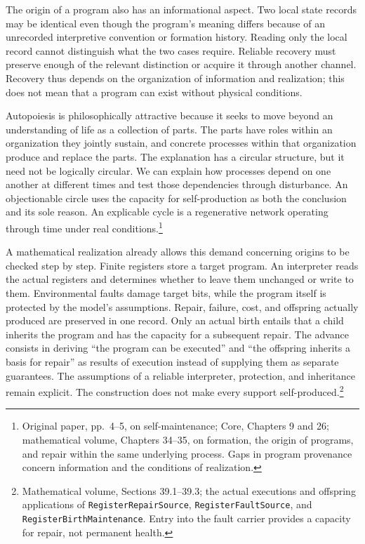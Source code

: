 \documentclass[
  english,
  11pt,
  oneside]{book}
\begin{document}
The origin of a program also has an informational aspect. Two local state records may be identical even though the program's meaning differs because of an unrecorded interpretive convention or formation history. Reading only the local record cannot distinguish what the two cases require. Reliable recovery must preserve enough of the relevant distinction or acquire it through another channel. Recovery thus depends on the organization of information and realization; this does not mean that a program can exist without physical conditions.

Autopoiesis is philosophically attractive because it seeks to move beyond an understanding of life as a collection of parts. The parts have roles within an organization they jointly sustain, and concrete processes within that organization produce and replace the parts. The explanation has a circular structure, but it need not be logically circular. We can explain how processes depend on one another at different times and test those dependencies through disturbance. An objectionable circle uses the capacity for self-production as both the conclusion and its sole reason. An explicable cycle is a regenerative network operating through time under real conditions.\footnote{\hypertarget{ph-note-15}{}Original paper, pp.~4--5, on self-maintenance; Core, Chapters 9 and 26; mathematical volume, Chapters 34--35, on formation, the origin of programs, and repair within the same underlying process. Gaps in program provenance concern information and the conditions of realization.}

A mathematical realization already allows this demand concerning origins to be checked step by step. Finite registers store a target program. An interpreter reads the actual registers and determines whether to leave them unchanged or write to them. Environmental faults damage target bits, while the program itself is protected by the model's assumptions. Repair, failure, cost, and offspring actually produced are preserved in one record. Only an actual birth entails that a child inherits the program and has the capacity for a subsequent repair. The advance consists in deriving ``the program can be executed'' and ``the offspring inherits a basis for repair'' as results of execution instead of supplying them as separate guarantees. The assumptions of a reliable interpreter, protection, and inheritance remain explicit. The construction does not make every support self-produced.\footnote{\hypertarget{ph-note-16}{}Mathematical volume, Sections 39.1--39.3; the actual executions and offspring applications of \texttt{RegisterRepairSource}, \texttt{RegisterFaultSource}, and \texttt{RegisterBirthMaintenance}. Entry into the fault carrier provides a capacity for repair, not permanent health.}
\end{document}
